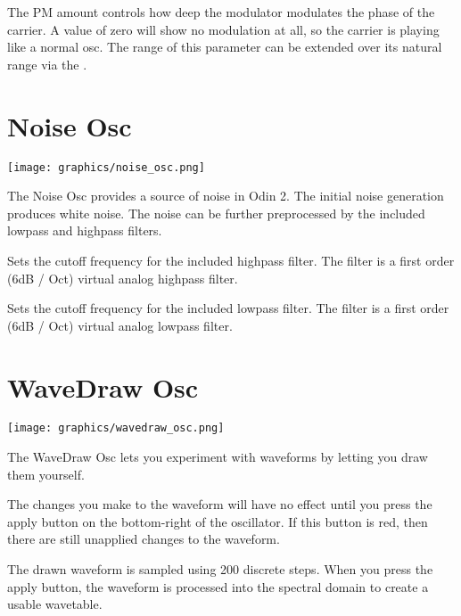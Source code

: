 {The PM amount controls how deep the modulator modulates the phase of the carrier. A value of zero will show no modulation at all, so the carrier is playing like a normal osc. The range of this parameter can be extended over its natural range via the \modmatrix.}

\section{Noise Osc}
\begin{center}
    \texttt{[image: graphics/noise\_osc.png]}
\end{center}

The Noise Osc provides a source of noise in Odin 2. The initial noise generation produces white noise. The noise can be further preprocessed by the included lowpass and highpass filters.

{Sets the cutoff frequency for the included highpass filter. The filter is a first order (6dB / Oct) virtual analog highpass filter.}

{Sets the cutoff frequency for the included lowpass filter. The filter is a first order (6dB / Oct) virtual analog lowpass filter.}

\section{WaveDraw Osc}
\label{wavedraw}
\begin{center}
    \texttt{[image: graphics/wavedraw\_osc.png]}
\end{center}
The WaveDraw Osc lets you experiment with waveforms by letting you draw them yourself.

\begin{tcolorbox}[colback=yellow!10!white,
        colframe=white!20!black,
        center,
        valign=top,
        halign=left,
        center title,
        width=\textwidth]

    The changes you make to the waveform will have no effect until you press the apply button on the bottom-right of the oscillator. If this button is red, then there are still unapplied changes to the waveform.
\end{tcolorbox}

The drawn waveform is sampled using 200 discrete steps. When you press the apply button, the waveform is processed into the spectral domain to create a usable wavetable.

